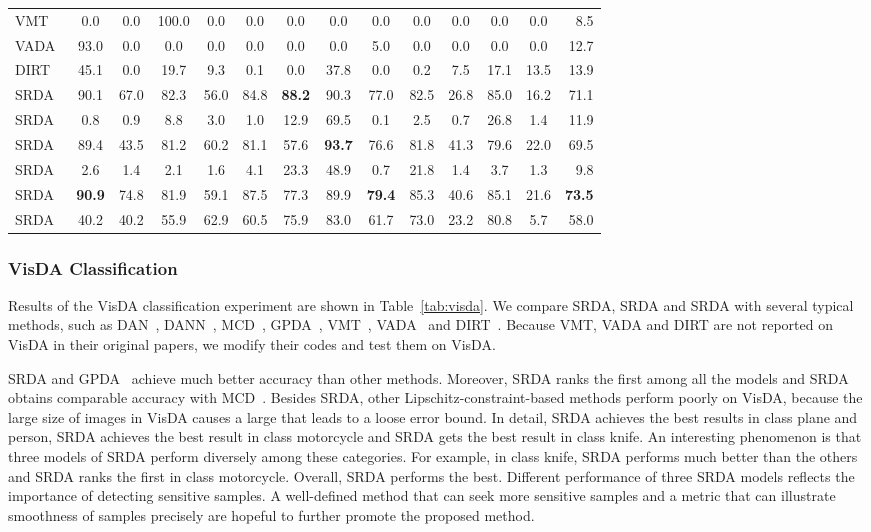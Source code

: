 \documentclass[journal,twocolumn]{IEEEtran}
\theoremstyle{definition}
\begin{document}
\begin{table*}[htbp]
\begin{tabular}{l|cccccccccccc|r}
\hline
VMT~\cite{mao2019virtual}&0.0&0.0&100.0&0.0&0.0&0.0&0.0&0.0&
0.0&0.0&0.0&0.0&8.5\\
VADA~\cite{shu2018a}&93.0&0.0&0.0&0.0&0.0&0.0&0.0&5.0&
0.0&0.0&0.0&0.0&12.7\\
DIRT~\cite{shu2018a}&45.1&0.0&19.7&9.3&0.1&0.0&37.8&0.0&
0.2&7.5&17.1&13.5&13.9\\
\hline
SRDA&90.1&67.0&82.3&56.0&84.8&{\bf 88.2}&90.3&77.0&
82.5&26.8&85.0&16.2&71.1\\
SRDA&0.8&0.9&8.8&3.0&1.0&12.9&69.5&0.1&
2.5&0.7&26.8&1.4&11.9\\
SRDA&89.4&43.5&81.2&60.2&81.1&57.6&{\bf 93.7}&76.6&
81.8&41.3&79.6&22.0&69.5\\
SRDA&2.6&1.4&2.1&1.6&4.1&23.3&48.9&0.7&
21.8&1.4&3.7&1.3&9.8\\
SRDA&{\bf 90.9}&74.8&81.9&59.1&87.5&77.3&89.9&{\bf 79.4}&
85.3&40.6&85.1&21.6&{\bf 73.5}\\
SRDA&40.2&40.2&55.9&62.9&60.5&75.9&83.0&61.7&
73.0&23.2&80.8&5.7&58.0\\
\hline\hline
\end{tabular}
\end{table*}
\subsubsection{VisDA Classification}

Results of the VisDA classification experiment are shown in Table~\ref{tab:visda}. We compare SRDA, SRDA and SRDA with several typical methods, such as DAN~\cite{pmlr-v37-long15}, DANN~\cite{ganin2016domain}, MCD~\cite{saito2018maximum}, GPDA~\cite{8953535}, VMT~\cite{mao2019virtual}, VADA~\cite{shu2018a} and DIRT~\cite{shu2018a}. Because VMT, VADA and DIRT are not reported on VisDA in their original papers, we modify their codes and test them on VisDA.

SRDA and GPDA~\cite{8953535} achieve much better accuracy than other methods. Moreover, SRDA ranks the first among all the models and SRDA obtains comparable accuracy with MCD~\cite{saito2018maximum}. Besides SRDA, other Lipschitz-constraint-based methods perform poorly on VisDA, because the large size of images in VisDA causes a large  that leads to a loose error bound. In detail, SRDA achieves the best results in class plane and person, SRDA achieves the best result in class motorcycle and SRDA gets the best result in class knife. An interesting phenomenon is that three models of SRDA perform diversely among these categories. For example, in class knife, SRDA performs much better than the others and SRDA ranks the first in class motorcycle. Overall, SRDA performs the best. Different performance of three SRDA models reflects the importance of detecting sensitive samples. A well-defined method that can seek more sensitive samples and a metric that can illustrate smoothness of samples precisely are hopeful to further promote the proposed method.
\end{document}
